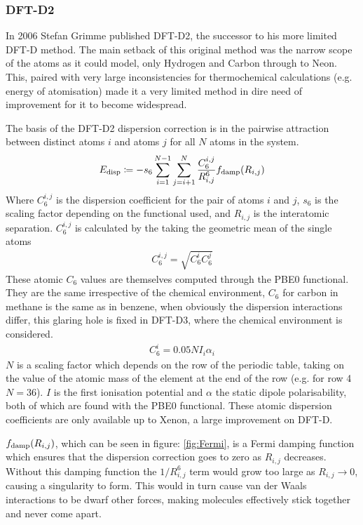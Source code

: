 \documentclass[10pt,a4paper,twocolumn,twoside]{extarticle}
\begin{document}
	\subsubsection{DFT-D2}
	In 2006 Stefan Grimme published DFT-D2\cite{Grimme2006}, 
	the successor to his more limited DFT-D method. The main setback of this original method was the narrow scope of the atoms as it could model, only Hydrogen and Carbon through to Neon. This, paired with very large inconsistencies for thermochemical calculations (e.g. energy of atomisation) made it a very limited method in dire need of improvement for it to become widespread.

	The basis of the DFT-D2 dispersion correction is in the pairwise attraction between distinct atoms $i$ and atoms $j$ for all $N$ atoms in the system. \cite{Grimme2006}
	\begin{align} \label{eq:D2}
	E_{\rm disp} \coloneqq -s_6 \sum^{N-1}_{i=1} \sum^N_{j=i+1} \frac{C^{i,j}_{6}}{R^6_{i,j}} f_{\rm damp}(R_{i,j})
	\end{align} 
	\noindent
	Where $C_6^{i,j}$ is the dispersion coefficient for the pair of atoms $i$ and $j$, $s_6$ is the scaling factor depending on the functional used, and $R_{i,j}$ is the interatomic separation. 
	$C_6^{i,j}$ is calculated by the taking the geometric mean of the single atoms 
	\begin{align} \label{eq:C6ij}
		C_6^{i,j} = \sqrt{C_6^i C_6^j}
	\end{align}
	These atomic $C_6$ values are themselves computed through the PBE0 functional\cite{Grimme2011}. They are the same irrespective of the chemical environment, $C_6$ for carbon in methane is the same as in benzene, when obviously the dispersion interactions differ, this glaring hole is fixed in DFT-D3, where the chemical environment is considered.
	\begin{align} \label{eq:C6i}
		C_6^i = 0.05NI_i \alpha_i
	\end{align}
	$N$ is a scaling factor which depends on the row of the periodic table, taking on the value of the atomic mass of the element at the end of the row (e.g. for row 4 $N = 36$). $I$ is the first ionisation potential and $\alpha$ the static dipole polarisability, both of which are found with the PBE$0$ functional. These atomic dispersion coefficients are only available up to Xenon, a large improvement on DFT-D.

	$f_{\rm damp}(R_{i,j})$, which can be seen in figure: \ref{fig:Fermi}, is a Fermi damping function which ensures that the dispersion correction goes to zero as $R_{i,j}$ decreases. Without this damping function the $1/R_{i,j}^6$ term would grow too large as $R_{i,j} \rightarrow 0$, causing a singularity to form. This would in turn cause van der Waals interactions to be dwarf other forces, making molecules effectively stick together and never come apart.
\end{document}
